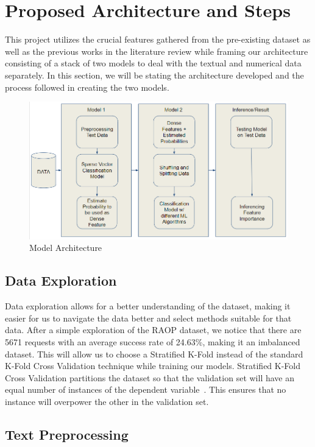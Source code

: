 \documentclass[runningheads]{llncs}
\begin{document}
\section{Proposed Architecture and Steps}
This project utilizes the crucial features gathered from the pre-existing dataset as well as the previous works in the literature review while framing our architecture consisting of a stack of two models to deal with the textual and numerical data separately. In this section, we will be stating the architecture developed and the process followed in creating the two models.
\vspace{-15pt}
\begin{figure}
    \centering
    \includegraphics[width=\linewidth]{arch_diag.png}
    \caption{Model Architecture} \label{fig1}
\end{figure}

\subsection{Data Exploration}
Data exploration allows for a better understanding of the dataset, making it easier for us to navigate the data better and select methods suitable for that data. After a simple exploration of the RAOP dataset, we notice that there are 5671 requests with an average success rate of 24.63\%, making it an imbalanced dataset. This will allow us to choose a Stratified K-Fold instead of the standard K-Fold Cross Validation technique while training our models. Stratified K-Fold Cross Validation partitions the dataset so that the validation set will have an equal number of instances of the dependent variable~\cite{strat_kfold}. This ensures that no instance will overpower the other in the validation set.

\subsection{Text Preprocessing}
\end{document}
